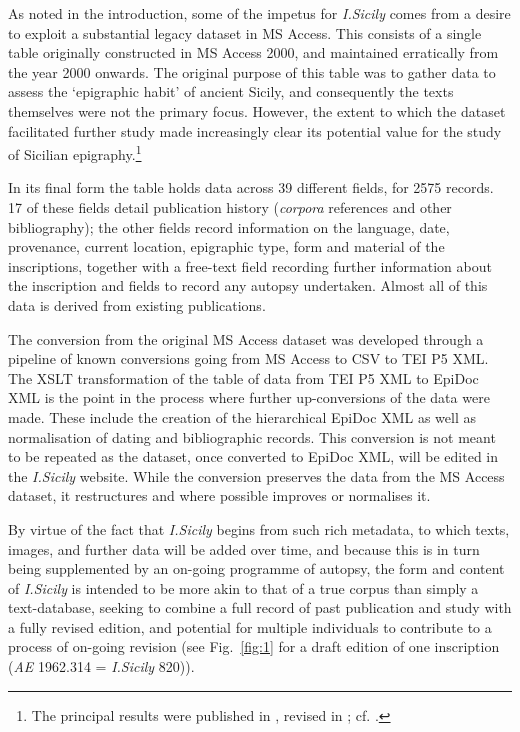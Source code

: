 \documentclass[amsthm,ebook]{saparticle}
\begin{document}
As noted in the introduction, some of the impetus for \emph{I.Sicily} comes from a desire to exploit a substantial legacy
dataset in MS Access. This consists of a single table originally constructed in MS Access 2000, and maintained
erratically from the year 2000 onwards. The original purpose of this table was to gather data to assess the `epigraphic
habit' of ancient Sicily, and consequently the texts themselves were not the primary focus. However, the extent to
which the dataset facilitated further study made increasingly clear its potential value for the study of Sicilian
epigraphy.\footnote{ The principal results were published in \citet{prag_epigraphy_2002}, revised in \citet[159-188]{prag_sicily_2004}; cf. \citet{prag_nouveau_2003, prag_ciceronian_2007, prag_sicilia_2008, prag_sicilia_2010}.}

In its final form the table holds data across 39 different fields, for 2575 records. 17 of these fields detail
publication history (\emph{corpora} references and other bibliography); the other fields record information on the language,
date, provenance, current location, epigraphic type, form and material of the inscriptions, together with a free-text
field recording further information about the inscription and fields to record any autopsy undertaken. Almost all of
this data is derived from existing publications.

The conversion from the original MS Access dataset was developed through a pipeline of known conversions going from MS
Access to CSV to TEI P5 XML. The XSLT transformation of the table of data from TEI P5 XML to EpiDoc XML is the point in
the process where further up-conversions of the data were made. These include the creation of the hierarchical EpiDoc
XML as well as normalisation of dating and bibliographic records. This conversion is not meant to be repeated as the
dataset, once converted to EpiDoc XML, will be edited in the \emph{I.Sicily} website. While the conversion preserves the data
from the MS Access dataset, it restructures and where possible improves or normalises it.

By virtue of the fact that \emph{I.Sicily} begins from such rich metadata, to which texts, images, and further data will be
added over time, and because this is in turn being supplemented by an on-going programme of autopsy, the form and
content of \emph{I.Sicily} is intended to be more akin to that of a true corpus than simply a text-database, seeking to
combine a full record of past publication and study with a fully revised edition, and potential for multiple
individuals to contribute to a process of on-going revision (see Fig.~\ref{fig:1} for a draft edition of one inscription (\emph{AE}
1962.314 = \emph{I.Sicily} 820)).
\end{document}

